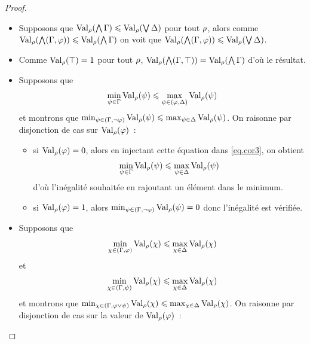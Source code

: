 \begin{proof}
\begin{itemize}
\begin{itemize}
      \ref{eq.cor1}, on obtient
      \[\min_{\varFP\in \varCG} \ValE(\varFP) \leq
      \max_{\varFP\in \varCD} \ValE(\varFP)\]
      d'où l'inégalité souhaitée.
    \end{itemize}
  \item[$\Rlw$~:] Supposons que
    $\operatorname{Val}_{\rho}(\bigwedge \Gamma) \leqslant \operatorname{Val}_{\rho}(\bigvee \Delta)$ pour tout
    $\rho$, alors comme
    $\operatorname{Val}_{\rho}(\bigwedge (\Gamma, \varphi)) \leqslant \operatorname{Val}_{\rho}(\bigwedge \Gamma)$
    on voit que
    $\operatorname{Val}_{\rho}(\bigwedge(\Gamma,\varphi)) \leqslant \operatorname{Val}_{\rho}(\bigvee\Delta)$.
  \item[$\Rtop$~:] Comme $\operatorname{Val}_{\rho}(\top) = 1$ pour tout $\rho$,
    $\operatorname{Val}_{\rho}(\bigwedge(\Gamma,\top)) = \operatorname{Val}_{\rho}(\bigwedge \Gamma)$ d'où le
    résultat.
  \item[$\Rlnot$~:] Supposons que
    \begin{equation}\label{eq.cor3}
      \min_{\psi \in \Gamma} \operatorname{Val}_{\rho}(\psi) \leqslant
      \max_{\psi \in (\varphi,\Delta)} \operatorname{Val}_{\rho}(\psi)
    \end{equation}
    et montrons que
    $\min_{\psi \in (\Gamma, \lnot \varphi)} \operatorname{Val}_{\rho}(\psi) \leqslant
    \max_{\psi \in \Delta} \operatorname{Val}_{\rho}(\psi)$. On raisonne par disjonction de cas
    sur $\operatorname{Val}_{\rho}(\varphi)$~:
    \begin{itemize}
    \item si $\operatorname{Val}_{\rho}(\varphi) = 0$, alors en injectant cette équation dans
      \ref{eq.cor3}, on obtient
      \[\min_{\varFP \in \varCG} \ValE(\varFP) \leq
      \max_{\varFP \in \varCD} \ValE(\varFP)\]
      d'où l'inégalité souhaitée en rajoutant un élément dans le minimum.
    \item si $\operatorname{Val}_{\rho}(\varphi) = 1$, alors
      $\min_{\psi \in (\Gamma, \lnot \varphi)} \operatorname{Val}_{\rho}(\psi) = 0$ donc
      l'inégalité est vérifiée.
    \end{itemize}
  \item[$\Rlor$~:] Supposons que
    \begin{equation}\label{eq.cor4}
      \min_{\chi \in (\Gamma, \varphi)} \operatorname{Val}_{\rho}(\chi)
      \leqslant \max_{\chi \in \Delta} \operatorname{Val}_{\rho}(\chi)
    \end{equation}
    et
    \begin{equation}\label{eq.cor5}
      \min_{\chi \in (\Gamma, \psi)} \operatorname{Val}_{\rho}(\chi) \leqslant
      \max_{\chi \in \Delta} \operatorname{Val}_{\rho}(\chi)
    \end{equation}
    et montrons que
    $\min_{\chi \in (\Gamma, \varphi \lor \psi)} \operatorname{Val}_{\rho}(\chi) \leqslant
    \max_{\chi \in \Delta} \operatorname{Val}_{\rho}(\chi)$.
    On raisonne par disjonction de cas sur la valeur de $\operatorname{Val}_{\rho}(\varphi)$~:

\end{itemize}
\end{proof}
